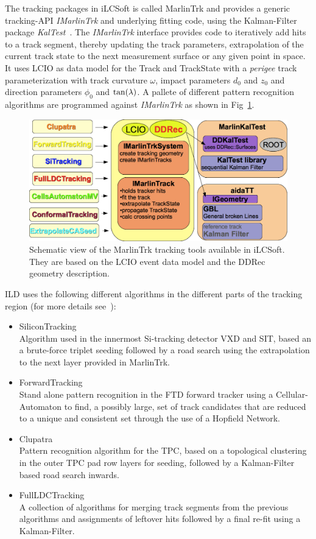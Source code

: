 The tracking packages in iLCSoft is called MarlinTrk and provides a generic tracking-API \emph{IMarlinTrk} and underlying fitting code,
using the Kalman-Filter package \emph{KalTest}~\cite{Li:2013cxa}.
The \emph{IMarlinTrk} interface provides code to iteratively add hits to a track segment,
thereby updating the track parameters, extrapolation of the current track state to the next measurement surface or any given point
in space. It uses LCIO as data model for the Track and TrackState with a \emph{perigee} track parameterization with
track curvature $\omega$, impact parameters $d_0$ and $z_0$ and direction parameters $\phi_0$ and $\rm{tan}(\lambda)$.
A pallete of different pattern recognition algorithms are programmed against \emph{IMarlinTrk} as shown in Fig~\ref{fig:imarlintrk}.
\begin{figure}
\begin{center}
\includegraphics[width=0.80\hsize]{chapters/figures/IMarlinTrk_ddkaltest_new.png}
\end{center}
\caption{Schematic view of the MarlinTrk tracking tools available in iLCSoft. They are based on the LCIO event data model and the
DDRec geometry description.}
\label{fig:imarlintrk}
\end{figure}
ILD uses the following different algorithms in the different parts of the tracking region
(for more details see~\cite{Gaede:2014aza}):

\begin{itemize}
\item SiliconTracking\\
  Algorithm used in the innermost Si-tracking detector VXD and SIT, based an a brute-force triplet seeding followed by
  a road search using the extrapolation to the next layer provided in MarlinTrk.
\item ForwardTracking\\
  Stand alone pattern recognition in the FTD forward tracker using a Cellular-Automaton to find, a possibly large, set of
  track candidates that are reduced to a unique and consistent set through the use of a Hopfield Network.
\item Clupatra\\
  Pattern recognition algorithm for the TPC, based on a topological clustering in the outer TPC pad row layers for seeding,
  followed by a Kalman-Filter based road search inwards.
\item FullLDCTracking\\
  A collection of algorithms for merging track segments from the previous algorithms and assignments of leftover hits followed
  by a final re-fit using a Kalman-Filter.
\end{itemize}

